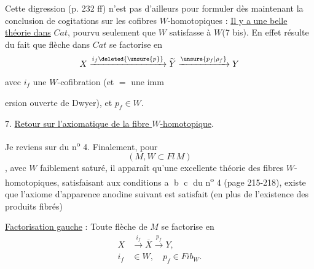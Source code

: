 Cette digression (p. 232 ff) n'est pas  d'ailleurs pour formuler dès maintenant la conclusion de  cogitations sur les cofibres $W$-homotopiques : \uline{Il y a une belle théorie dans} $Cat$, pourvu seulement que $W$ satisfasse à $W$(7 bis). En effet  résulte du fait que  flèche  dans $Cat$ se factorise en
\[
 X\xrightarrow{i_f\deleted{\unsure{p}}}\widetilde Y\xrightarrow{\unsure{p_f|\rho_f}}Y
\]
avec $i_f$ une $W$-cofibration (et $=$ une imm



ersion ouverte de Dwyer), et $p_f\in W$.

7. \uline{Retour sur l'axiomatique de la fibre $W$-homotopique}.

Je reviens sur  du n\textsuperscript{o} 4. Finalement, pour
\[
 (M,W\subset Fl\,M)
\]
, avec $W$ faiblement saturé, il apparaît qu'une excellente théorie des fibres $W$-homotopiques, satisfaisant aux conditions \textcircled{a} \textcircled{b} \textcircled{c} du n\textsuperscript{o} 4 (page 215-218), existe  que l'axiome  d'apparence anodine suivant est satisfait (en plus de l'existence  des produits fibrés)


\uline{Factorisation gauche} : Toute flèche  de $M$ se factorise en
\[
 \begin{aligned}
 X&\xrightarrow{i_f}\overline X\xrightarrow{p_f}Y,\\
 i_f&\in W,\quad p_f\in Fib_W.
 \end{aligned}
\]


